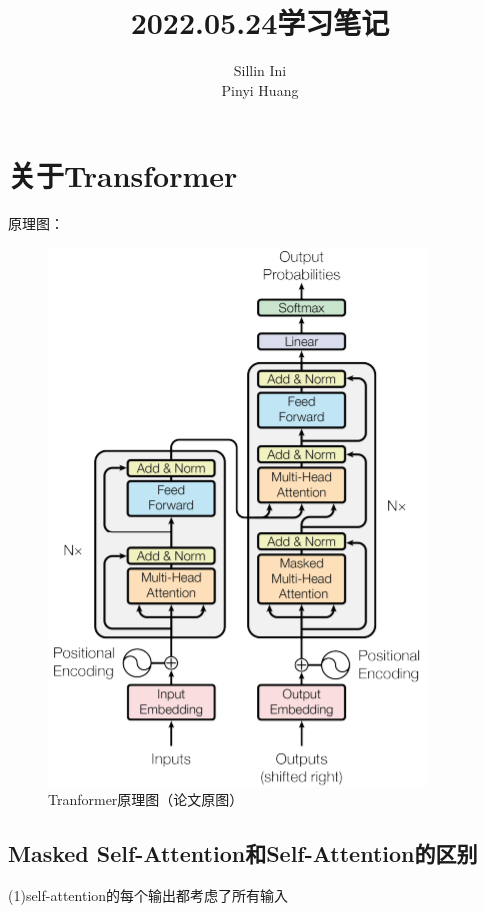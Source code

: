 \documentclass[AutoFakeBold]{MyFormat}
\begin{document}
%
%


\title{{2022.05.24学习笔记}}
\author{Sillin Ini\\Pinyi Huang}
\maketitle
\thispagestyle{empty}
\newpage

\tableofcontents
\thispagestyle{empty}
\newpage

\mainmatter




\setcounter{chapter}{0}

\chapter{关于Transformer}

\par 原理图：

\begin{figure}[!h]
    \centering
    \includegraphics[width=0.4\linewidth]{figures/2022.05.24/pic1.png}
    \caption{Tranformer原理图（论文原图）}
\end{figure}

\section{Masked Self-Attention和Self-Attention的区别}
\par (1)self-attention的每个输出都考虑了所有输入
\end{document}
